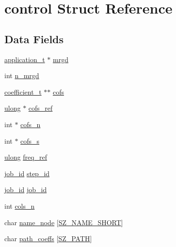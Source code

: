 \hypertarget{structcontrol}{}\section{control Struct Reference}
\label{structcontrol}
\subsection*{Data Fields}
\begin{DoxyCompactItemize}
\item 
\hyperlink{application_8h_af0a524c43fc5f548021099181df194bf}{application\+\_\+t} $\ast$ \hyperlink{structcontrol_a04135aa2d6b29eecc4170e2aaf6c3932}{mrgd}
\item 
int \hyperlink{structcontrol_a78580ddada2c63b02e7dd4e740f2e838}{n\+\_\+mrgd}
\item 
\hyperlink{coefficient_8h_ae9e93dca86a1dd13e152e183589cdeda}{coefficient\+\_\+t} $\ast$$\ast$ \hyperlink{structcontrol_a1fb1319059177f24405d983bf9257d54}{cofs}
\item 
\hyperlink{generic_8h_a718b4eb2652c286f4d42dc18a8e71a1a}{ulong} $\ast$ \hyperlink{structcontrol_a5d69e959a6826d6dd049018d077deca7}{cofs\+\_\+ref}
\item 
int $\ast$ \hyperlink{structcontrol_a16cff1fe6d8306a8e9feff2ec5cc61f7}{cofs\+\_\+n}
\item 
int $\ast$ \hyperlink{structcontrol_a1ebfe3ea1c817cf610430425debe0535}{cofs\+\_\+s}
\item 
\hyperlink{generic_8h_a718b4eb2652c286f4d42dc18a8e71a1a}{ulong} \hyperlink{structcontrol_af98c6f06898291c5e6cb06bc0d386530}{freq\+\_\+ref}
\item 
\hyperlink{generic_8h_aa17a8e6cdc1860741119dc46c1777778}{job\+\_\+id} \hyperlink{structcontrol_a5c60a2ddd48af987e6e6f169f0bce418}{step\+\_\+id}
\item 
\hyperlink{generic_8h_aa17a8e6cdc1860741119dc46c1777778}{job\+\_\+id} \hyperlink{structcontrol_af1bc7a403a34f7e8250cf42a4bca8d34}{job\+\_\+id}
\item 
int \hyperlink{structcontrol_a65f0109f7133188cd43aeeaa3358b912}{cols\+\_\+n}
\item 
char \hyperlink{structcontrol_a468bfded513333b2191ea4dcecd52d7f}{name\+\_\+node} \mbox{[}\hyperlink{sizes_8h_aa1539eb7e3aa7e9eb929e62cfb80e621}{S\+Z\+\_\+\+N\+A\+M\+E\+\_\+\+S\+H\+O\+RT}\mbox{]}
\item 
char \hyperlink{structcontrol_a4a9fe143850eab7bc8908ae309713005}{path\+\_\+coeffs} \mbox{[}\hyperlink{sizes_8h_abf7d7dd1d18e459056eb207d220de187}{S\+Z\+\_\+\+P\+A\+TH}\mbox{]}
$$
\end{DoxyCompactItemize}
